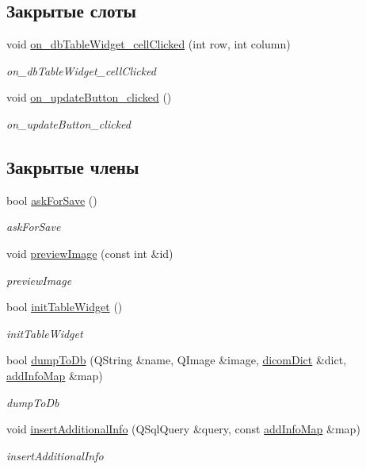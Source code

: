 \subsection*{Закрытые слоты}
\begin{DoxyCompactItemize}
\item 
void \hyperlink{classDbForm_ae26fa6d6d1be86e8fff9766d64392fdd}{on\+\_\+db\+Table\+Widget\+\_\+cell\+Clicked} (int row, int column)
\begin{DoxyCompactList}\small\item\em on\+\_\+db\+Table\+Widget\+\_\+cell\+Clicked \end{DoxyCompactList}\item 
void \hyperlink{classDbForm_aa1f2f6562e51324bb3dc453f9579380b}{on\+\_\+update\+Button\+\_\+clicked} ()
\begin{DoxyCompactList}\small\item\em on\+\_\+update\+Button\+\_\+clicked \end{DoxyCompactList}\end{DoxyCompactItemize}
\subsection*{Закрытые члены}
\begin{DoxyCompactItemize}
\item 
bool \hyperlink{classDbForm_a40fbf82d24dc0e20031aef14dc4a8366}{ask\+For\+Save} ()
\begin{DoxyCompactList}\small\item\em ask\+For\+Save \end{DoxyCompactList}\item 
void \hyperlink{classDbForm_a56e109480a6bd4556baaf369bc79f99f}{preview\+Image} (const int \&id)
\begin{DoxyCompactList}\small\item\em preview\+Image \end{DoxyCompactList}\item 
bool \hyperlink{classDbForm_af79b6454611a052e4da31db0bac13ed1}{init\+Table\+Widget} ()
\begin{DoxyCompactList}\small\item\em init\+Table\+Widget \end{DoxyCompactList}\item 
bool \hyperlink{classDbForm_a3453aae86a90552e3e7dd84b38315cc0}{dump\+To\+Db} (Q\+String \&name, Q\+Image \&image, \hyperlink{tagshelpers_8h_ae25d30658f61420b88a380dc9e40bb74}{dicom\+Dict} \&dict, \hyperlink{dbform_8h_a1ec1a645f41e1c6544d384ca863a936c}{add\+Info\+Map} \&map)
\begin{DoxyCompactList}\small\item\em dump\+To\+Db \end{DoxyCompactList}\item 
void \hyperlink{classDbForm_ab375348c98051eea969574da00484c29}{insert\+Additional\+Info} (Q\+Sql\+Query \&query, const \hyperlink{dbform_8h_a1ec1a645f41e1c6544d384ca863a936c}{add\+Info\+Map} \&map)
\begin{DoxyCompactList}\small\item\em insert\+Additional\+Info \end{DoxyCompactList}\end{DoxyCompactItemize}
